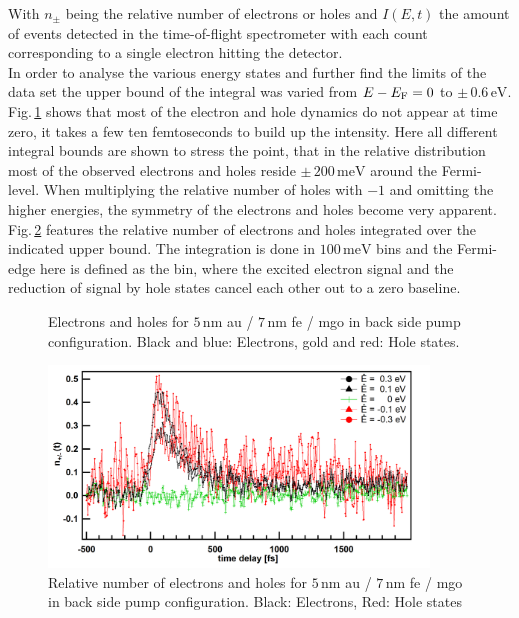 \documentclass[a4paper,12pt,twoside]{article}
\begin{document}
   
    With $n_{\pm}$ being the relative number of electrons or holes and $I(E,t)$ the amount of events detected in the time-of-flight spectrometer with each count corresponding to a single electron hitting the detector.\\
    In order to analyse the various energy states and further find the limits of the data set the upper bound of the integral was varied from $E - E_{\rm{F}}=0$ to $\pm\, 0.6\,\mathrm{\mbox{eV}}$. Fig.\,\ref{EandH5BP} shows that most of the electron and hole dynamics do not appear at time zero, it takes a few ten femtoseconds to build up the intensity. Here all different integral bounds are shown to stress the point, that in the relative distribution most of the observed electrons and holes reside $\pm\,200\,\mathrm{\mbox{meV}}$ around the Fermi-level. When multiplying the relative number of holes with $-1$ and omitting the higher energies, the symmetry of the electrons and holes become very apparent. Fig.\,\ref{EandH5BPsym} features the relative number of electrons and holes integrated over the indicated upper bound. The integration is done in $100\,\mathrm{meV}$ bins and the Fermi-edge here is defined as the bin, where the excited electron signal and the reduction of signal by hole states cancel each other out to a zero baseline. 
	\begin{figure}[H]
		\caption{Electrons and holes for $5\,\mathrm{nm}$ \gls{au} / $7\,\mathrm{nm}$ \gls{fe} / \gls{mgo} in back side pump configuration. Black and blue: Electrons, gold and red: Hole states.}
    		\label{EandH5BP}
	\end{figure}
    	\begin{figure}[H]
			\includegraphics[width=0.9\textwidth]{figures/EandH5BPsymImproved.png}
			\caption{Relative number of electrons and holes for $5\,\mathrm{nm}$ \gls{au} / $7\,\mathrm{nm}$ \gls{fe} / \gls{mgo} in back side pump configuration. Black: Electrons, Red: Hole states}
			\label{EandH5BPsym}
        \end{figure}
\end{document}
